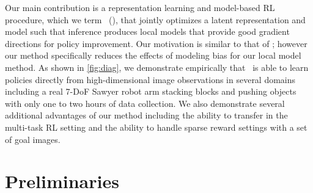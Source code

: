 Our main contribution is a representation learning and model-based RL procedure, which we term \methodname\ (\metabbr), that jointly optimizes a latent representation and model such that inference produces local models that provide good gradient directions for policy improvement. Our motivation is similar to that of \citet{e2c,spatial-ae}; however our method specifically reduces the effects of modeling bias for our local model method. As shown in \autoref{fig:diag}, we demonstrate empirically that \metabbr\ is able to learn policies directly from high-dimensional image observations in several domains including a real 7-DoF Sawyer robot arm stacking blocks and pushing objects with only one to two hours of data collection. We also demonstrate several additional advantages of our method including the ability to transfer in the multi-task RL setting and the ability to handle sparse reward settings with a set of goal images.


\section{Preliminaries}
\label{sec:prelim}

